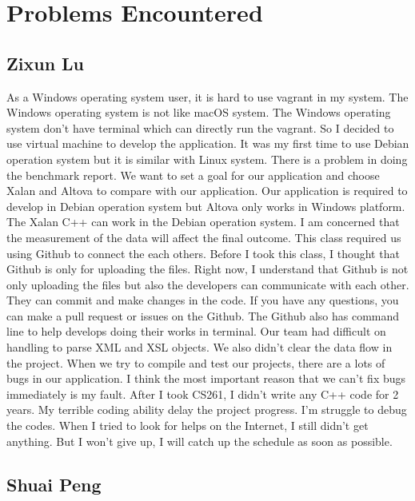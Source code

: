 \section{Problems Encountered}

\subsection{Zixun Lu}

As a Windows operating system user, it is hard to use vagrant in my system.
The Windows operating system is not like macOS system. 
The Windows operating system don't have terminal which can directly run the vagrant. 
So I decided to use virtual machine to develop the application.
It was my first time to use Debian operation system but it is similar with Linux system. 
There is a problem in doing the benchmark report. 
We want to set a goal for our application and choose Xalan and Altova to compare with our application. 
Our application is required to develop in Debian operation system but Altova only works in Windows platform. 
The Xalan C++ can work in the Debian operation system. 
I am concerned that the measurement of the data will affect the final outcome. 
This class required us using Github to connect the each others.
Before I took this class, I thought that Github is only for uploading the files.
Right now, I understand that Github is not only uploading the files but also the developers can communicate with each other.
They can commit and make changes in the code. 
If you have any questions, you can make a pull request or issues on the Github. 
The Github also has command line to help develops doing their works in terminal. 
Our team had difficult on handling to parse XML and XSL objects.
We also didn’t clear the data flow in the project. 
When we try to compile and test our projects, there are a lots of bugs in our application. 
I think the most important reason that we can’t fix bugs immediately is my fault. After I took CS261, I didn’t write any C++ code for 2 years. My terrible coding ability delay the project progress. 
I’m struggle to debug the codes. 
When I tried to look for helps on the Internet, I still didn’t get anything.
But I won't give up, I will catch up the schedule as soon as possible.  

\subsection{Shuai Peng}

